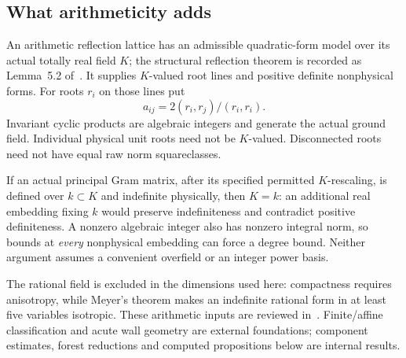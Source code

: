 \documentclass[11pt]{article}
\begin{document}
\subsection{What arithmeticity adds}
An arithmetic reflection lattice has an admissible quadratic-form
model over its actual totally real field $K$; the structural reflection
theorem is recorded as Lemma~5.2 of~\cite{ABSW}. It supplies $K$-valued
root lines and positive definite nonphysical forms. For roots $r_i$ on
those lines put
\[
 a_{ij}=2(r_i,r_j)/(r_i,r_i).
\]
Invariant cyclic products are algebraic integers and generate the
actual ground field. Individual physical unit roots need not be
$K$-valued. Disconnected roots need not have equal raw norm squareclasses.

If an actual principal Gram matrix, after its specified permitted
$K$-rescaling, is defined over $k\subset K$ and indefinite physically,
then $K=k$: an additional real embedding fixing $k$ would preserve
indefiniteness and contradict positive definiteness.
A nonzero algebraic integer also has nonzero integral norm, so bounds
at \emph{every} nonphysical embedding can force a degree bound.
Neither argument assumes a convenient overfield or an integer power basis.

The rational field is excluded in the dimensions used here: compactness
requires anisotropy, while Meyer's theorem makes an indefinite rational
form in at least five variables isotropic. These arithmetic inputs are
reviewed in~\cite{Belolipetsky}. Finite/affine classification and acute
wall geometry are external foundations; component estimates, forest
reductions and computed propositions below are internal results.
\end{document}

